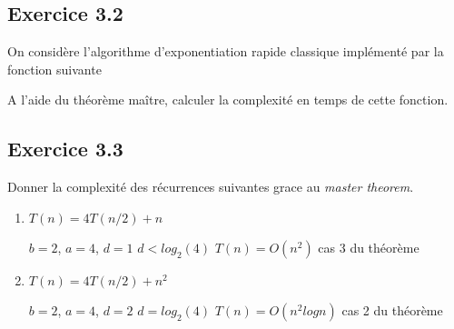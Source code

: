 \documentclass{article}[12pt]
\begin{document}
  \subsection*{Exercice 3.2}
  
  On considère l'algorithme d'exponentiation rapide classique implémenté par la fonction suivante
  
  \begin{tcolorbox}
\begin{algorithmic}[1]
        \State{}
    \EndIf
        \State{}
    \EndIf
        \State{}
    \Else
        \State{}
    \EndIf

  \EndFunction
  \end{algorithmic}
\end{tcolorbox}  
  
  A l'aide du théorème maître, calculer la complexité en temps de cette fonction.
  

\subsection*{Exercice 3.3}
Donner la complexité des récurrences suivantes grace au \textit{master theorem}.
\begin{enumerate}
\item $T(n)=4T(n/2)+n$
\begin{solution}
\begin{tabbing} $b=2$, $a=4$, $d=1$ $d<log_2(4)$ $T(n)=O(n^2)$ cas 3 du théorème 
\end{tabbing}
\end{solution}
\item $T(n)=4T(n/2)+n^2$
\begin{solution}
\begin{tabbing} $b=2$, $a=4$, $d=2$ $d=log_2(4)$ $T(n)=O(n^2logn)$ cas 2 du théorème 
\end{tabbing}
\end{solution}
\end{enumerate}
\end{document}
